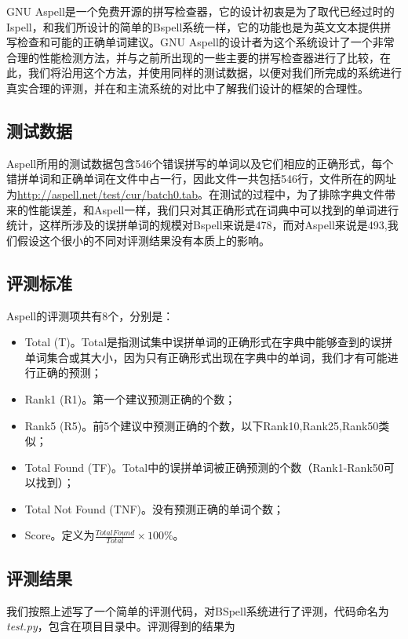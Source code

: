 \documentclass[UTF8,a4paper]{ctexart}
\begin{document}
GNU Aspell\cite{atkinson2011gnu}是一个免费开源的拼写检查器，它的设计初衷是为了取代已经过时的Ispell\cite{gorin19712003}，和我们所设计的简单的Bspell系统一样，它的功能也是为英文文本提供拼写检查和可能的正确单词建议。GNU Aspell的设计者为这个系统设计了一个非常合理的性能检测方法，并与之前所出现的一些主要的拼写检查器进行了比较，在此，我们将沿用这个方法，并使用同样的测试数据，以便对我们所完成的系统进行真实合理的评测，并在和主流系统的对比中了解我们设计的框架的合理性。

\subsection{测试数据}

Aspell所用的测试数据包含546个错误拼写的单词以及它们相应的正确形式，每个错拼单词和正确单词在文件中占一行，因此文件一共包括546行，文件所在的网址为\url{http://aspell.net/test/cur/batch0.tab}。在测试的过程中，为了排除字典文件带来的性能误差，和Aspell一样，我们只对其正确形式在词典中可以找到的单词进行统计，这样所涉及的误拼单词的规模对Bspell来说是478，而对Aspell来说是493,我们假设这个很小的不同对评测结果没有本质上的影响。

\subsection{评测标准}

Aspell的评测项共有8个，分别是：

\begin{itemize}
\item Total (T)。Total是指测试集中误拼单词的正确形式在字典中能够查到的误拼单词集合或其大小，因为只有正确形式出现在字典中的单词，我们才有可能进行正确的预测；
\item Rank1 (R1)。第一个建议预测正确的个数；
\item Rank5 (R5)。前5个建议中预测正确的个数，以下Rank10,Rank25,Rank50类似；
\item Total Found (TF)。Total中的误拼单词被正确预测的个数（Rank1-Rank50可以找到）；
\item Total Not Found (TNF)。没有预测正确的单词个数；
\item Score。定义为$\frac{Total Found}{Total} \times 100\%$。
\end{itemize}

\subsection{评测结果}

我们按照上述写了一个简单的评测代码，对BSpell系统进行了评测，代码命名为\textit{test.py}，包含在项目目录中。评测得到的结果为
\end{document}
